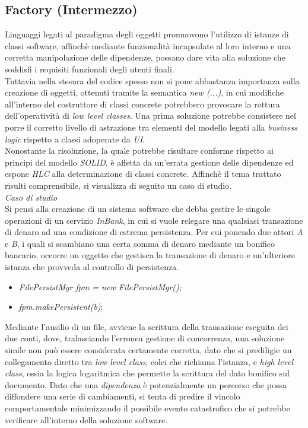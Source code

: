\documentclass{article}
\begin{document}
\subsection*{Factory (Intermezzo)}
\large
Linguaggi legati al paradigma degli oggetti promuovono l'utilizzo di istanze di classi software, affinchè mediante funzionalità incapsulate al loro interno e una corretta manipolazione delle dipendenze, possano dare vita alla soluzione che soddisfi i requisiti funzionali degli utenti finali.\vspace*{14pt}\\
Tuttavia nella stesura del codice spesso non si pone abbastanza importanza sulla creazione di oggetti, ottenuti tramite la semantica \textit{new (...)}, in cui modifiche all'interno del costruttore di classi concrete potrebbero provocare la rottura dell'operatività di \textit{low level classes}. Una prima soluzione potrebbe consistere nel porre il corretto livello di astrazione tra elementi del modello legati alla \textit{business logic} rispetto a classi adoperate da \textit{UI}.\vspace*{14pt}\\
Nonostante la risoluzione, la quale potrebbe risultare conforme rispetto ai principi del modello \textit{SOLID}, è affetta da un'errata gestione delle dipendenze ed espone \textit{HLC} alla determinazione di classi concrete. Affinchè il tema trattato risulti comprensibile, si visualizza di seguito un caso di studio.\vspace*{14pt}\\
\textit{Caso di studio}\\
Si pensi alla creazione di un sistema software che debba gestire le singole operazioni di un servizio \textit{InBank}, in cui si vuole relegare una qualsiasi transazione di denaro ad una condizione di estrema persistenza. Per cui ponendo due attori \textit{A} e \textit{B}, i quali si scambiano una certa somma di denaro mediante un bonifico bancario, occorre un oggetto che gestisca la transazione di denaro e un'ulteriore istanza che provveda al controllo di persistenza. 
\begin{itemize}[label={ }, leftmargin=1cm]
    \itemsep0em
    \item \textit{FilePersistMgr fpm = new FilePersistMgr();}
    \item \textit{fpm.makePersistent(b)};
\end{itemize} 
Mediante l'ausilio di un file, avviene la scrittura della transazione eseguita dei due conti, dove, tralasciando l'erronea gestione di concorrenza, una soluzione simile non può essere considerata certamente corretta, dato che si prediligie un collegamento diretto tra \textit{low level class}, colei che richiama l'istanza, e \textit{high level class}, ossia la logica logaritmica che permette la scrittura del dato bonifico sul documento. Dato che una \textit{dipendenza} è potenzialmente un percorso che possa diffondere una serie di cambiamenti, si tenta di predire il vincolo comportamentale minimizzando il possibile evento catastrofico che si potrebbe verificare all'interno della soluzione software.\vspace*{14pt}\\
\end{document}
